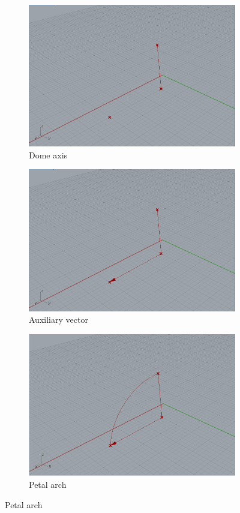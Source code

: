 \documentclass[preprint,12pt,3p]{elsarticle}
\begin{document}
\begin{figure}
\begin{subfigure}{0.3\textwidth}
  \centering
  \includegraphics[width=.9\linewidth]{a01s03.png}
  \caption{Dome axis}
  \label{fig:a01s03}
\end{subfigure}
\begin{subfigure}{0.3\textwidth}
  \centering
  \includegraphics[width=.9\linewidth]{a01s04a.png}
  \caption{Auxiliary vector}
  \label{fig:a01s04a}
\end{subfigure}
\begin{subfigure}{0.3\textwidth}
  \centering
  \includegraphics[width=.9\linewidth]{a01s04b.png}
  \caption{Petal arch}
  \label{fig:a01s04b}
\end{subfigure}



\end{figure}
\end{document}

